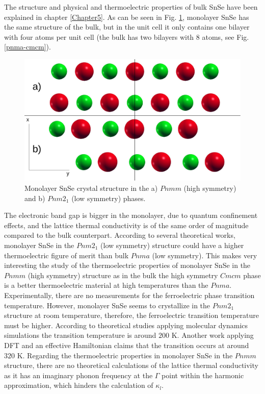 The structure and physical and thermoelectric properties of bulk SnSe have been explained in chapter \ref{Chapter5}. 
As can be seen in Fig. \ref{pnma-cmcm-mono}, monolayer SnSe has the same structure of the bulk, but in the unit cell 
it only contains one bilayer with four atoms per unit cell (the bulk has two bilayers with 8 atoms, see 
Fig. \ref{pnma-cmcm}). 
\begin{figure}[h]
\begin{center}
\includegraphics[width=0.8\linewidth]{Figures/monolayer-structure.pdf}
\caption{Monolayer SnSe crystal structure in the a) $Pnmm$ (high symmetry) and b) $Pnm2_{1}$ (low symmetry) phases.}
\label{pnma-cmcm-mono}
\end{center}
\end{figure}
The electronic band gap is bigger in the monolayer\cite{wang2015thermoelectric,hu2017high}, due to quantum 
confinement effects, and the lattice thermal conductivity is of the same order of 
magnitude\cite{wang2015thermoelectric,hu2017high} compared to the bulk counterpart. According to several theoretical 
works, monolayer SnSe in the $Pnm2_{1}$ (low symmetry) structure could have a higher thermoelectric figure of 
merit\cite{wang2015thermoelectric,hu2017high} than bulk $Pnma$ (low symmetry). This makes very interesting the study 
of the thermoelectric properties of monolayer SnSe in the $Pnmm$ (high symmetry) structure as in the bulk the high 
symmetry $Cmcm$ phase is a better thermoelectric material at high temperatures than the $Pnma$. \\

Experimentally, there are no measurements for the ferroelectric phase transition temperature. However, monolayer 
SnSe seems to crystallize in the $Pnm2_{1}$ structure at room temperature\cite{li2013single}, therefore, the 
ferroelectric transition temperature must be higher. According to theoretical studies applying molecular dynamics 
simulations\cite{mehboudi2016structural,barraza2018tuning} the transition temperature is around $200$ K. Another 
work applying DFT and an effective Hamiltonian claims\cite{fei2016ferroelectricity} that the transition occurs at 
around $320$ K. Regarding the thermoelectric properties in monolayer SnSe in the $Pnmm$ structure, there are no 
theoretical calculations of the lattice thermal conductivity as it has an imaginary phonon frequency at the $\Gamma$ 
point within the harmonic approximation, which hinders the calculation of $\kappa_{l}$. \\

